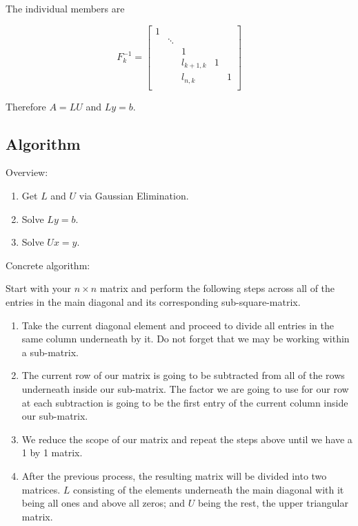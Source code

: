 The individual members are 

\[
    F_{k}^{-1} = 
    \begin{bmatrix}
        1 &        &         &   &        \\
          & \ddots &         &   &        \\
          &        & 1       &   &        \\
          &        & l_{k+1,k} & 1 &        \\
          &        & l_{n,k}      &   & 1 \\
    \end{bmatrix}
\]

Therefore \(A = LU\) and \(Ly = b\).

\subsection{Algorithm}

Overview: 

\begin{enumerate}
    
    \item Get \(L\) and \(U\) via Gaussian Elimination. 

    \item Solve \(Ly = b\). 

    \item Solve \(Ux = y\). 

\end{enumerate}

Concrete algorithm: 

Start with your \(n \times n\) matrix and perform the following steps across all of the 
entries in the main diagonal and its corresponding sub-square-matrix.

\begin{enumerate}

    \item Take the current diagonal element and proceed to divide all entries in the same column underneath by it. Do not forget that we may be working 
    within a sub-matrix.

    \item The current row of our matrix is going to be subtracted from all of the rows underneath inside our sub-matrix. The factor we 
    are going to use for our row at each subtraction is going to be the first entry of the current column inside our sub-matrix.
    
    \item We reduce the scope of our matrix and repeat the steps above until we have a 1 by 1 matrix.
    
    \item After the previous process, the resulting matrix will be divided into two matrices. \(L\) consisting of 
    the elements underneath the main diagonal with it being all ones and above all zeros; and \(U\) being the rest, the upper triangular matrix.

\end{enumerate}

